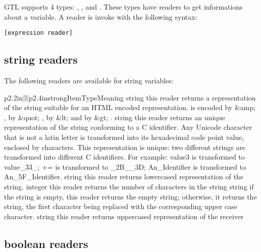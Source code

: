 GTL supports 4 types: , ,  and . These types have readers %
to get informations about a variable. A reader is invoke with the following syntax:

\begin{lstlisting}
[expression reader]
\end{lstlisting}

\subsection{string readers}

The following readers are available for string variables:

\begin{longtableiii}{p{2.2in}|l|p{2.4in}}{strong}{Item}{Type}{Meaning}
  {string}
  {this reader returns a representation of the string suitable for an HTML encoded representation. \character{\&} is encoded by \&amp; ,  by \&quot; , \character{<} by \&lt; and \character{>} by \&gt; .}
  {string}
  {this reader returns an unique representation of the string conforming to a C identifier. Any Unicode character that is not a latin letter is transformed into its hexadecimal code point value, enclosed by \character{_} characters. This representation is unique: two different strings are transformed into different C identifiers. For example: value3 is transformed to value\_33\_; += is transformed to \_2B\_\_3D;
An\_Identifier is transformed to An\_5F\_Identifier.}
  {string}
  {this reader returns lowercased representation of the string.}
  {integer}
  {this reader returns the number of characters in the string}
  {string}
  {if the string is empty, this reader returns the empty string; otherwise, it returns the string, the first character being replaced with the corresponding upper case character.}
  {string}
  {this reader returns uppercased representation of the receiver}
\end{longtableiii}

\subsection{boolean readers}

